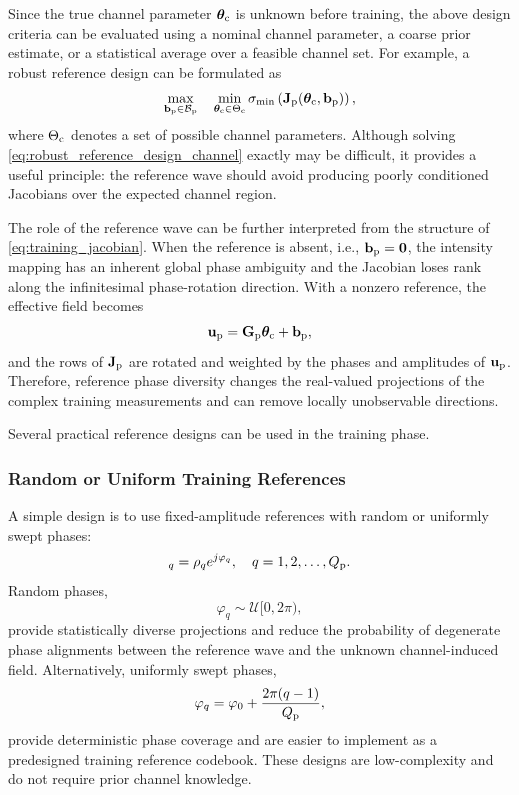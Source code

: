 \documentclass[journal]{IEEEtran}
\begin{document}
Since the true channel parameter $\boldsymbol{\theta}_{\rm c}$ is unknown before training, the above design criteria can be evaluated using a nominal channel parameter, a coarse prior estimate, or a statistical average over a feasible channel set. 
For example, a robust reference design can be formulated as
\begin{equation}
\max_{\mathbf{b}_{\rm p}\in\mathcal{B}_{\rm p}}
\quad
\min_{\boldsymbol{\theta}_{\rm c}\in\Theta_{\rm c}}
\sigma_{\min}
\left(
\mathbf{J}_{\rm p}(\boldsymbol{\theta}_{\rm c},\mathbf{b}_{\rm p})
\right),
\label{eq:robust_reference_design_channel}
\end{equation}
where $\Theta_{\rm c}$ denotes a set of possible channel parameters. 
Although solving \eqref{eq:robust_reference_design_channel} exactly may be difficult, it provides a useful principle: the reference wave should avoid producing poorly conditioned Jacobians over the expected channel region.

The role of the reference wave can be further interpreted from the structure of \eqref{eq:training_jacobian}. 
When the reference is absent, i.e., $\mathbf{b}_{\rm p}=\mathbf{0}$, the intensity mapping has an inherent global phase ambiguity and the Jacobian loses rank along the infinitesimal phase-rotation direction. 
With a nonzero reference, the effective field becomes
\begin{equation}
\mathbf{u}_{\rm p}
=
\mathbf{G}_{\rm p}\boldsymbol{\theta}_{\rm c}
+
\mathbf{b}_{\rm p},
\end{equation}
and the rows of $\mathbf{J}_{\rm p}$ are rotated and weighted by the phases and amplitudes of $\mathbf{u}_{\rm p}$. 
Therefore, reference phase diversity changes the real-valued projections of the complex training measurements and can remove locally unobservable directions.

Several practical reference designs can be used in the training phase.

\subsubsection{Random or Uniform Training References}

A simple design is to use fixed-amplitude references with random or uniformly swept phases:
\begin{equation}
[\mathbf{b}_{\rm p}]_q
=
\rho_q e^{j\varphi_q},
\quad
q=1,2,\ldots,Q_{\rm p}.
\end{equation}
Random phases,
\begin{equation}
\varphi_q\sim\mathcal{U}[0,2\pi),
\end{equation}
provide statistically diverse projections and reduce the probability of degenerate phase alignments between the reference wave and the unknown channel-induced field. 
Alternatively, uniformly swept phases,
\begin{equation}
\varphi_q
=
\varphi_0
+
\frac{2\pi(q-1)}{Q_{\rm p}},
\end{equation}
provide deterministic phase coverage and are easier to implement as a predesigned training reference codebook. 
These designs are low-complexity and do not require prior channel knowledge.
\end{document}
